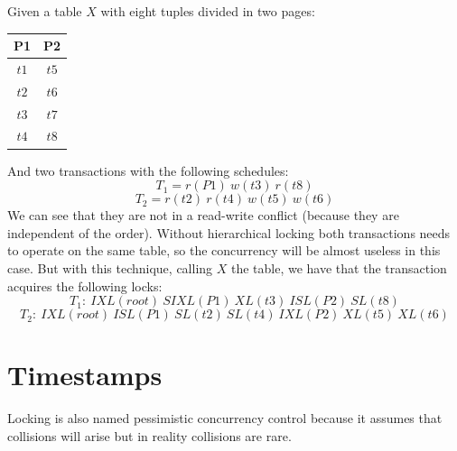 \documentclass[12pt, a4paper]{report}
\begin{document}
\begin{itemize}
\begin{table}[H]
\begin{tabular}{ccccccc}
            \end{tabular}
        \end{table}
        \begin{example}
            Given a table $X$ with eight tuples divided in two pages: 
            \begin{table}[H]
                \centering
                \begin{tabular}{cc}
                \textbf{P1}                 & \textbf{P2}               \\ \hline
                \multicolumn{1}{|c|}{$t1$}  & \multicolumn{1}{c|}{$t5$} \\ \hline
                \multicolumn{1}{|c|}{$t2$}  & \multicolumn{1}{c|}{$t6$} \\ \hline
                \multicolumn{1}{|c|}{$t3$}  & \multicolumn{1}{c|}{$t7$} \\ \hline
                \multicolumn{1}{|c|}{$t4$}  & \multicolumn{1}{c|}{$t8$} \\ \hline
                \end{tabular}
            \end{table}
            And two transactions with the following schedules: 
            \[T_1=r(P1)\:w(t3)\:r(t8)\]
            \[T_2=r(t2)\:r(t4)\:w(t5)\:w(t6)\]
            We can see that they are not in a read-write conflict (because they are independent of the order). Without hierarchical locking both transactions needs to operate on the 
            same table, so the concurrency will be almost useless in this case. But with this technique, calling $X$ the table, we have that the transaction acquires the following
            locks: 
            \[T_1:\:IXL(root)\:SIXL(P1)\:XL(t3)\:ISL(P2)\:SL(t8)\]
            \[T_2:\:IXL(root)\:ISL(P1)\:SL(t2)\:SL(t4)\:IXL(P2)\:XL(t5)\:XL(t6)\]
        \end{example}
    \end{itemize}

    \section{Timestamps}
    Locking is also named pessimistic concurrency control because it assumes that collisions will arise but in reality collisions are rare. 
    
\end{document}
